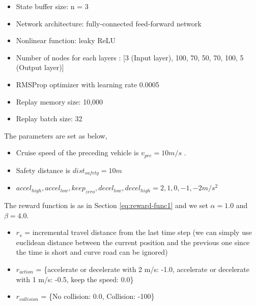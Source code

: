 \begin{itemize}
\item State buffer size: n = 3
\item Network architecture: fully-connected feed-forward network
\item Nonlinear function: leaky ReLU
\item Number of nodes for each layers : [3 (Input layer), 100, 70, 50, 70, 100, 5 (Output layer)]
\item RMSProp optimizer with learning rate 0.0005
\item Replay memory size: 10,000
\item Replay batch size: 32
\end{itemize}

The parameters are set as below,

\begin{itemize}
\item Cruise speed of the preceding vehicle is $v_{pre} = 10 m/s$ .
\item Safety distance is $dist_{safety} = 10 m$
\item $accel_{high}, accel_{low}, keep_{zero}, decel_{low}, decel_{high} = {2, 1, 0, -1, -2} m/s^2$
\end{itemize}

The reward function is as in Section \ref{eq:reward-func1} and we set $\alpha = 1.0$ and $\beta = 4.0$. 

\begin{itemize}
 \item $r_s$ = incremental travel distance from the last time step (we can simply use euclidean distance between the current position and the previous one since the time is short and curve road can be ignored)
 \item $r_{action}$ = \{accelerate or decelerate with 2 m/s: -1.0, accelerate or decelerate with 1 m/s: -0.5, keep the speed: 0.0\}
 \item $r_{collision}$ = \{No collision: 0.0, Collision: -100\}
\end{itemize}


